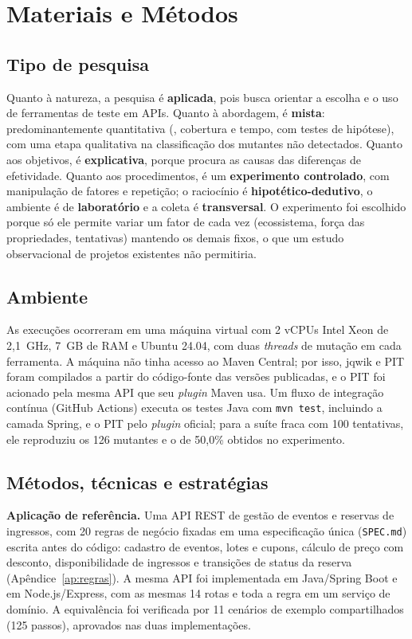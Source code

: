 \section{Materiais e Métodos}

\subsection{Tipo de pesquisa}

Quanto à natureza, a pesquisa é \textbf{aplicada}, pois busca orientar a escolha e o uso de ferramentas de teste em APIs. Quanto à abordagem, é \textbf{mista}: predominantemente quantitativa (\ms{}, cobertura e tempo, com testes de hipótese), com uma etapa qualitativa na classificação dos mutantes não detectados. Quanto aos objetivos, é \textbf{explicativa}, porque procura as causas das diferenças de efetividade. Quanto aos procedimentos, é um \textbf{experimento controlado}, com manipulação de fatores e repetição; o raciocínio é \textbf{hipotético-dedutivo}, o ambiente é de \textbf{laboratório} e a coleta é \textbf{transversal}. O experimento foi escolhido porque só ele permite variar um fator de cada vez (ecossistema, força das propriedades, tentativas) mantendo os demais fixos, o que um estudo observacional de projetos existentes não permitiria.

\subsection{Ambiente}

As execuções ocorreram em uma máquina virtual com 2 vCPUs Intel Xeon de 2,1~GHz, 7~GB de RAM e Ubuntu 24.04, com duas \textit{threads} de mutação em cada ferramenta. A máquina não tinha acesso ao Maven Central; por isso, jqwik e PIT foram compilados a partir do código-fonte das versões publicadas, e o PIT foi acionado pela mesma API que seu \textit{plugin} Maven usa. Um fluxo de integração contínua (GitHub Actions) executa os testes Java com \texttt{mvn test}, incluindo a camada Spring, e o PIT pelo \textit{plugin} oficial; para a suíte fraca com 100 tentativas, ele reproduziu os 126 mutantes e o \ms{} de 50,0\% obtidos no experimento.

\subsection{Métodos, técnicas e estratégias}

\textbf{Aplicação de referência.} Uma API REST de gestão de eventos e reservas de ingressos, com 20 regras de negócio fixadas em uma especificação única (\texttt{SPEC.md}) escrita antes do código: cadastro de eventos, lotes e cupons, cálculo de preço com desconto, disponibilidade de ingressos e transições de status da reserva (Apêndice~\ref{ap:regras}). A mesma API foi implementada em Java/Spring Boot e em Node.js/Express, com as mesmas 14 rotas e toda a regra em um serviço de domínio. A equivalência foi verificada por 11 cenários de exemplo compartilhados (125 passos), aprovados nas duas implementações.

